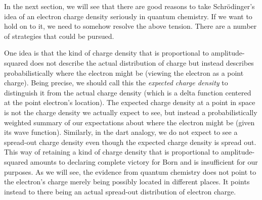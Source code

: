 \documentclass[onecolumn,secnumarabic,amsmath,amssymb,balancelastpage,nofootinbib]{article}
\begin{document}
In the next section, we will see that there are good reasons to take Schr\"{o}dinger's idea of an electron charge density seriously in quantum chemistry.  If we want to hold on to it, we need to somehow resolve the above tension.  There are a number of strategies that could be pursued.

One idea is that the kind of charge density that is proportional to amplitude-squared does not describe the actual distribution of charge but instead describes probabilistically where the electron might be (viewing the electron as a point charge).  Being precise, we should call this the \emph{expected charge density} to distinguish it from the actual charge density (which is a delta function centered at the point electron's location).  The expected charge density at a point in space is not the charge density we actually expect to see, but instead a probabilistically weighted summary of our expectations about where the electron might be (given its wave function).  Similarly, in the dart analogy, we do not expect to see a spread-out charge density even though the expected charge density is spread out.  This way of retaining a kind of charge density that is proportional to amplitude-squared amounts to declaring complete victory for Born and is insufficient for our purposes.  As we will see, the evidence from quantum chemistry does not point to the electron's charge merely being possibly located in different places.  It points instead to there being an actual spread-out distribution of electron charge.
\end{document}

